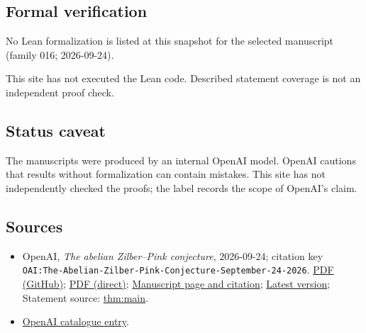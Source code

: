 \documentclass[11pt]{article}
\begin{document}
\subsection{Formal verification}
No Lean formalization is listed at this snapshot for the selected manuscript (family 016; 2026-09-24).

This site has not executed the Lean code. Described statement coverage is not an independent proof check.

\subsection{Status caveat}
The manuscripts were produced by an internal OpenAI model. OpenAI cautions that results without formalization can contain mistakes. This site has not independently checked the proofs; the label records the scope of OpenAI's claim.

\subsection{Sources}
\begin{itemize}
\item OpenAI, \emph{The abelian Zilber–Pink conjecture}, 2026-09-24; citation key \texttt{OAI:The-Abelian-Zilber-Pink-Conjecture-September-24-2026}. \href{https://github.com/openai/math/blob/adc7f1241b42e322a6451854ab7e4b4c146bf78a/preprints/The-Abelian-Zilber-Pink-Conjecture-September-24-2026/paper.pdf}{PDF (GitHub)}; \href{https://github.com/openai/math/raw/adc7f1241b42e322a6451854ab7e4b4c146bf78a/preprints/The-Abelian-Zilber-Pink-Conjecture-September-24-2026/paper.pdf}{PDF (direct)}; \href{https://github.com/openai/math/blob/adc7f1241b42e322a6451854ab7e4b4c146bf78a/preprints/The-Abelian-Zilber-Pink-Conjecture-September-24-2026/README.md}{Manuscript page and citation}; \href{https://github.com/openai/math/blob/main/preprints/The-Abelian-Zilber-Pink-Conjecture-September-24-2026/paper.pdf}{Latest version}; Statement source: \href{https://github.com/openai/math/blob/adc7f1241b42e322a6451854ab7e4b4c146bf78a/preprints/The-Abelian-Zilber-Pink-Conjecture-September-24-2026/build/sections/01-introduction.tex\#L43}{thm:main}.
\item \href{https://github.com/openai/math/blob/adc7f1241b42e322a6451854ab7e4b4c146bf78a/CONTENTS.md}{OpenAI catalogue entry}.
\end{itemize}
\end{document}
